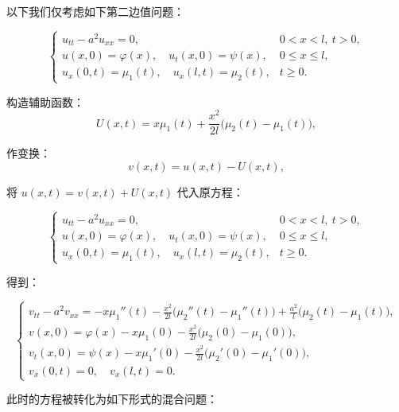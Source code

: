 \documentclass[12pt,a4paper]{article}
\numberwithin{subsection}{section}   %
\numberwithin{subsubsection}{subsection}
\theoremstyle{plain}
\theoremstyle{definition}
\theoremstyle{remark}
\theoremstyle{remark}
\begin{document}
		
		以下我们仅考虑如下第二边值问题：
		
		\begin{equation}
			\begin{cases}
				u_{tt} - a^2 u_{xx} = 0, & 0 < x < l, \ t > 0, \\
				u(x, 0) = \varphi(x), \quad u_t(x, 0) = \psi(x), & 0 \leq x \leq l, \\
				u_x(0, t) = \mu_1(t), \quad u_x(l, t) = \mu_2(t), & t \geq 0.
			\end{cases}
		\end{equation}
		
		构造辅助函数：
		\begin{equation}
			U(x, t) = x\mu_1(t) + \frac{x^2}{2l}\big( \mu_2(t) - \mu_1(t) \big),
		\end{equation}
		
		作变换：
		\begin{equation}
			v(x, t) = u(x, t) - U(x, t),
		\end{equation}
		
		将 \(u(x, t) = v(x, t) + U(x, t)\) 代入原方程：
		
		\begin{equation}
			\begin{cases}
				u_{tt} - a^2 u_{xx} = 0, & 0 < x < l, \ t > 0, \\
				u(x, 0) = \varphi(x), \quad u_t(x, 0) = \psi(x), & 0 \leq x \leq l, \\
				u_x(0, t) = \mu_1(t), \quad u_x(l, t) = \mu_2(t), & t \geq 0.
			\end{cases}
		\end{equation}
		
		得到：
		
		\begin{equation}
			\begin{cases}
				v_{tt} - a^2 v_{xx} = -x\mu_1''(t) - \frac{x^2}{2l}\big( \mu_2''(t) - \mu_1''(t) \big) + \frac{a^2}{l}\big( \mu_2(t) - \mu_1(t) \big), \\
				v(x, 0) = \varphi(x) - x\mu_1(0) - \frac{x^2}{2l}\big( \mu_2(0) - \mu_1(0) \big), \\
				v_t(x, 0) = \psi(x) - x\mu_1'(0) - \frac{x^2}{2l}\big( \mu_2'(0) - \mu_1'(0) \big), \\
				v_x(0, t) = 0, \quad v_x(l, t) = 0.
			\end{cases}
		\end{equation}
		
		此时的方程被转化为如下形式的混合问题：
		
\end{document}
